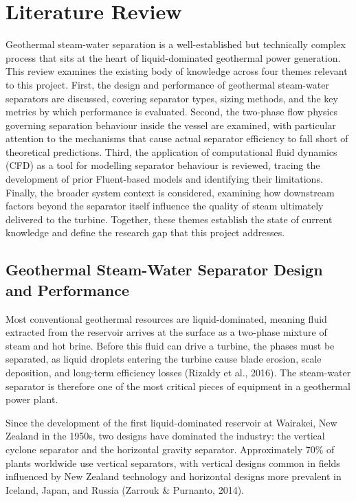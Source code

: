 \section{Literature Review}
\label{sec:literature-review}

Geothermal steam-water separation is a well-established but technically complex process that sits at the heart of liquid-dominated geothermal power generation. This review examines the existing body of knowledge across four themes relevant to this project. First, the design and performance of geothermal steam-water separators are discussed, covering separator types, sizing methods, and the key metrics by which performance is evaluated. Second, the two-phase flow physics governing separation behaviour inside the vessel are examined, with particular attention to the mechanisms that cause actual separator efficiency to fall short of theoretical predictions. Third, the application of computational fluid dynamics (CFD) as a tool for modelling separator behaviour is reviewed, tracing the development of prior Fluent-based models and identifying their limitations. Finally, the broader system context is considered, examining how downstream factors beyond the separator itself influence the quality of steam ultimately delivered to the turbine. Together, these themes establish the state of current knowledge and define the research gap that this project addresses.

\subsection{Geothermal Steam-Water Separator Design and Performance}

Most conventional geothermal resources are liquid-dominated, meaning fluid extracted from the reservoir arrives at the surface as a two-phase mixture of steam and hot brine. Before this fluid can drive a turbine, the phases must be separated, as liquid droplets entering the turbine cause blade erosion, scale deposition, and long-term efficiency losses (Rizaldy et al., 2016). The steam-water separator is therefore one of the most critical pieces of equipment in a geothermal power plant.

Since the development of the first liquid-dominated reservoir at Wairakei, New Zealand in the 1950s, two designs have dominated the industry: the vertical cyclone separator and the horizontal gravity separator. Approximately 70\% of plants worldwide use vertical separators, with vertical designs common in fields influenced by New Zealand technology and horizontal designs more prevalent in Iceland, Japan, and Russia (Zarrouk \& Purnanto, 2014).

